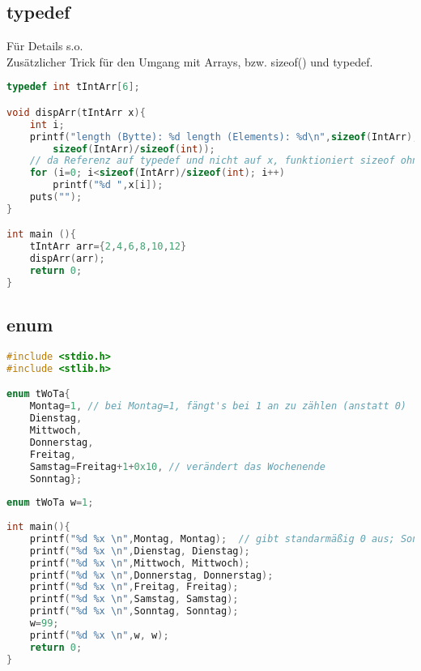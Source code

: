 \subsection{typedef}
Für Details s.o. \\
Zusätzlicher Trick für den Umgang mit Arrays, bzw. sizeof() und typedef.
\begin{lstlisting}[language=C]
typedef int tIntArr[6];

void dispArr(tIntArr x){
	int i;
	printf("length (Bytte): %d length (Elements): %d\n",sizeof(IntArr),
		sizeof(IntArr)/sizeof(int));
	// da Referenz auf typedef und nicht auf x, funktioniert sizeof ohne Probleme
	for (i=0; i<sizeof(IntArr)/sizeof(int); i++)	
		printf("%d ",x[i]);
	puts("");
}

int main (){
	tIntArr arr={2,4,6,8,10,12}
	dispArr(arr);
	return 0;
}
\end{lstlisting}

\subsection{enum}

\begin{lstlisting}[language=C]
#include <stdio.h>
#include <stlib.h>

enum tWoTa{
	Montag=1, // bei Montag=1, fängt's bei 1 an zu zählen (anstatt 0)
	Dienstag, 
	Mittwoch, 
	Donnerstag,
	Freitag,
	Samstag=Freitag+1+0x10,	// verändert das Wochenende
	Sonntag};
	
enum tWoTa w=1;
	
int main(){
	printf("%d %x \n",Montag, Montag);	// gibt standarmäßig 0 aus; Sonntag wäre 6 usw.
	printf("%d %x \n",Dienstag, Dienstag);
	printf("%d %x \n",Mittwoch, Mittwoch);
	printf("%d %x \n",Donnerstag, Donnerstag);
	printf("%d %x \n",Freitag, Freitag);
	printf("%d %x \n",Samstag, Samstag);
	printf("%d %x \n",Sonntag, Sonntag);
	w=99;	
	printf("%d %x \n",w, w);
	return 0;
}
\end{lstlisting}
